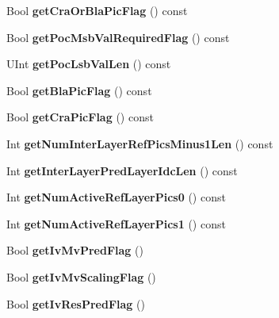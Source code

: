 \begin{DoxyCompactItemize}
Bool {\bfseries get\+Cra\+Or\+Bla\+Pic\+Flag} () const
\item 
\mbox{\label{class_t_com_slice_a04da007019e5fd5de5ec4098e7c78eab}} 
Bool {\bfseries get\+Poc\+Msb\+Val\+Required\+Flag} () const
\item 
\mbox{\label{class_t_com_slice_af1907ecd54bb9119508c08c2be4461ec}} 
U\+Int {\bfseries get\+Poc\+Lsb\+Val\+Len} () const
\item 
\mbox{\label{class_t_com_slice_a79e87f91d4b703fc233090a3b6e2b043}} 
Bool {\bfseries get\+Bla\+Pic\+Flag} () const
\item 
\mbox{\label{class_t_com_slice_a9a564e8b5030b39d0a94bb47cce030c0}} 
Bool {\bfseries get\+Cra\+Pic\+Flag} () const
\item 
\mbox{\label{class_t_com_slice_a8f6bacfaa9710665f1b7ebe72c34141e}} 
Int {\bfseries get\+Num\+Inter\+Layer\+Ref\+Pics\+Minus1\+Len} () const
\item 
\mbox{\label{class_t_com_slice_a4d3d72e9568e1a46cface346086eb22b}} 
Int {\bfseries get\+Inter\+Layer\+Pred\+Layer\+Idc\+Len} () const
\item 
\mbox{\label{class_t_com_slice_ad31fcfb07205ee80b1fc4678dcb058ff}} 
Int {\bfseries get\+Num\+Active\+Ref\+Layer\+Pics0} () const
\item 
\mbox{\label{class_t_com_slice_a143c3e1a32a7dbda0b0ab527ef55e99a}} 
Int {\bfseries get\+Num\+Active\+Ref\+Layer\+Pics1} () const
\item 
\mbox{\label{class_t_com_slice_a7f481214a4ad6ea96942ad9ddc69e7a2}} 
Bool {\bfseries get\+Iv\+Mv\+Pred\+Flag} ()
\item 
\mbox{\label{class_t_com_slice_af4b88f5270597f2b7e4c6dd7e1cf0e3b}} 
Bool {\bfseries get\+Iv\+Mv\+Scaling\+Flag} ()
\item 
\mbox{\label{class_t_com_slice_a24c08be29fb47eefbf1dcc46945f6c1a}} 
Bool {\bfseries get\+Iv\+Res\+Pred\+Flag} ()

\end{DoxyCompactItemize}
